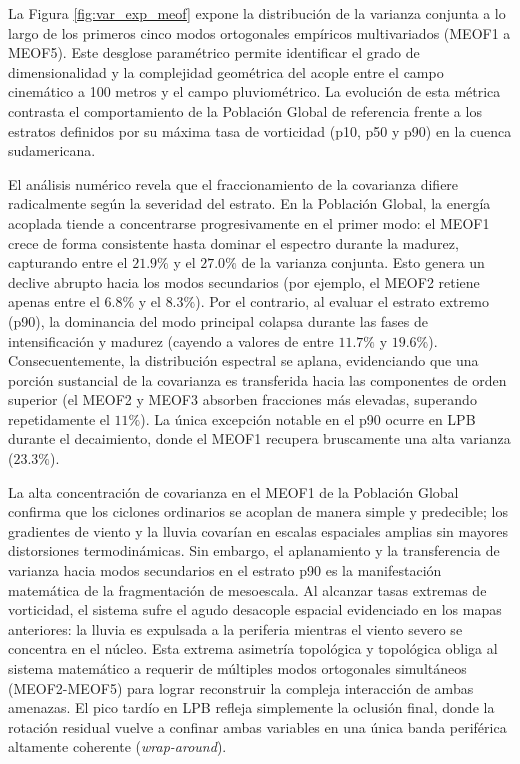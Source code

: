La Figura \ref{fig:var_exp_meof} expone la distribución de la varianza conjunta a lo largo de los primeros cinco modos ortogonales empíricos multivariados (MEOF1 a MEOF5). Este desglose paramétrico permite identificar el grado de dimensionalidad y la complejidad geométrica del acople entre el campo cinemático a 100 metros y el campo pluviométrico. La evolución de esta métrica contrasta el comportamiento de la Población Global de referencia frente a los estratos definidos por su máxima tasa de vorticidad (p10, p50 y p90) en la cuenca sudamericana.

El análisis numérico revela que el fraccionamiento de la covarianza difiere radicalmente según la severidad del estrato. En la Población Global, la energía acoplada tiende a concentrarse progresivamente en el primer modo: el MEOF1 crece de forma consistente hasta dominar el espectro durante la madurez, capturando entre el $21.9\%$ y el $27.0\%$ de la varianza conjunta. Esto genera un declive abrupto hacia los modos secundarios (por ejemplo, el MEOF2 retiene apenas entre el $6.8\%$ y el $8.3\%$). Por el contrario, al evaluar el estrato extremo (p90), la dominancia del modo principal colapsa durante las fases de intensificación y madurez (cayendo a valores de entre $11.7\%$ y $19.6\%$). Consecuentemente, la distribución espectral se aplana, evidenciando que una porción sustancial de la covarianza es transferida hacia las componentes de orden superior (el MEOF2 y MEOF3 absorben fracciones más elevadas, superando repetidamente el $11\%$). La única excepción notable en el p90 ocurre en LPB durante el decaimiento, donde el MEOF1 recupera bruscamente una alta varianza ($23.3\%$).

La alta concentración de covarianza en el MEOF1 de la Población Global confirma que los ciclones ordinarios se acoplan de manera simple y predecible; los gradientes de viento y la lluvia covarían en escalas espaciales amplias sin mayores distorsiones termodinámicas. Sin embargo, el aplanamiento y la transferencia de varianza hacia modos secundarios en el estrato p90 es la manifestación matemática de la fragmentación de mesoescala. Al alcanzar tasas extremas de vorticidad, el sistema sufre el agudo desacople espacial evidenciado en los mapas anteriores: la lluvia es expulsada a la periferia mientras el viento severo se concentra en el núcleo. Esta extrema asimetría topológica y topológica obliga al sistema matemático a requerir de múltiples modos ortogonales simultáneos (MEOF2-MEOF5) para lograr reconstruir la compleja interacción de ambas amenazas. El pico tardío en LPB refleja simplemente la oclusión final, donde la rotación residual vuelve a confinar ambas variables en una única banda periférica altamente coherente (\textit{wrap-around}).

